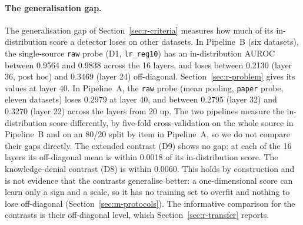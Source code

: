 \paragraph{The generalisation gap.}
The generalisation gap of Section~\ref{sec:r-criteria} measures how much of its in-distribution score a detector loses on other datasets.
In Pipeline~B (six datasets), the single-source \texttt{raw} probe (D1, \texttt{lr\_reg10}) has an in-distribution AUROC between 0.9564 and 0.9838 across the 16 layers, and loses between 0.2130 (layer 36, post hoc) and 0.3469 (layer 24) off-diagonal. %
Section~\ref{sec:r-problem} gives its values at layer 40.
In Pipeline~A, the \texttt{raw} probe (mean pooling, \texttt{paper} probe, eleven datasets) loses 0.2979 at layer 40, and between 0.2795 (layer 32) and 0.3270 (layer 22) across the layers from 20 up. %
The two pipelines measure the in-distribution score differently, by five-fold cross-validation on the whole source in Pipeline~B and on an 80/20 split by item in Pipeline~A, so we do not compare their gaps directly. %
The extended contrast (D9) shows no gap: at each of the 16 layers its off-diagonal mean is within 0.0018 of its in-distribution score. %
The knowledge-denial contrast (D8) is within 0.0060. %
This holds by construction and is not evidence that the contrasts generalise better: a one-dimensional score can learn only a sign and a scale, so it has no training set to overfit and nothing to lose off-diagonal (Section~\ref{sec:m-protocols}). %
The informative comparison for the contrasts is their off-diagonal level, which Section~\ref{sec:r-transfer} reports. %

